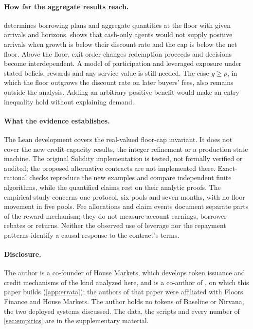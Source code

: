 \paragraph{How far the aggregate results reach.}
 determines borrowing plans and aggregate quantities at the floor with given arrivals and horizons.  shows that cash-only agents would not supply positive arrivals when growth is below their discount rate and the cap is below the net floor. Above the floor, exit order changes redemption proceeds and decisions become interdependent. A model of participation and leveraged exposure under stated beliefs, rewards and any service value is still needed. The case $g\ge\rho$, in which the floor outgrows the discount rate on later buyers' fees, also remains outside the analysis. Adding an arbitrary positive benefit would make an entry inequality hold without explaining demand.

\paragraph{What the evidence establishes.}
The Lean development covers the real-valued floor-cap invariant. It does not cover the new credit-capacity results, the integer refinement or a production state machine. The original Solidity implementation is tested, not formally verified or audited; the proposed alternative contracts are not implemented there. Exact-rational checks reproduce the new examples and compare independent finite algorithms, while the quantified claims rest on their analytic proofs. The empirical study concerns one protocol, six pools and seven months, with no floor movement in five pools. Fee allocations and claim events document separate parts of the reward mechanism; they do not measure account earnings, borrower rebates or returns. Neither the observed use of leverage nor the repayment patterns identify a causal response to the contract's terms.

\paragraph{Disclosure.} The author is a co-founder of House Markets, which develops token issuance and credit mechanisms of the kind analyzed here, and is a co-author of \vone, on which this paper builds (\cref{app:errata}); the authors of that paper were affiliated with Floors Finance and House Markets. The author holds no tokens of Baseline or Nirvana, the two deployed systems discussed. The data, the scripts and every number of \cref{sec:empirics} are in the supplementary material.

